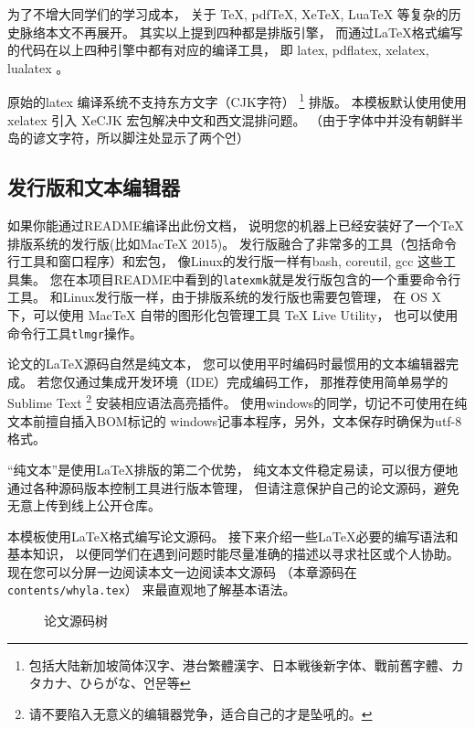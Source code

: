 为了不增大同学们的学习成本，
关于 TeX, pdfTeX,  XeTeX,  LuaTeX 等复杂的历史脉络本文不再展开。
其实以上提到四种都是排版引擎，
而通过\LaTeX 格式编写的代码在以上四种引擎中都有对应的编译工具，
即 latex, pdflatex, xelatex, lualatex 。

原始的latex 编译系统不支持东方文字（CJK字符）
\footnote{包括大陆新加坡简体汉字、港台繁體漢字、日本戦後新字体、戰前舊字體、カタカナ、ひらがな、언문等}
排版。
本模板默认使用使用 xelatex 引入 XeCJK 宏包解决中文和西文混排问题。
（由于字体中并没有朝鲜半岛的谚文字符，所以脚注处显示了两个언）

\subsection{发行版和文本编辑器}
如果你能通过README编译出此份文档，
说明您的机器上已经安装好了一个\TeX 排版系统的发行版(比如MacTeX 2015)。
发行版融合了非常多的工具（包括命令行工具和窗口程序）和宏包，
像Linux的发行版一样有bash, coreutil, gcc 这些工具集。
您在本项目README中看到的\texttt{latexmk}就是发行版包含的一个重要命令行工具。
和Linux发行版一样，由于排版系统的发行版也需要包管理，
在 OS X 下，可以使用 MacTeX 自带的图形化包管理工具 TeX Live Utility，
也可以使用命令行工具\texttt{tlmgr}操作。

论文的\LaTeX 源码自然是纯文本，
您可以使用平时编码时最惯用的文本编辑器完成。
若您仅通过集成开发环境（IDE）完成编码工作，
那推荐使用简单易学的Sublime Text
\footnote{请不要陷入无意义的编辑器党争，适合自己的才是坠吼的。}
安装相应语法高亮插件。
使用windows的同学，切记不可使用在纯文本前擅自插入BOM标记的
windows记事本程序，另外，文本保存时确保为utf-8格式。

“纯文本”是使用\LaTeX 排版的第二个优势，
纯文本文件稳定易读，可以很方便地通过各种源码版本控制工具进行版本管理，
但请注意保护自己的论文源码，避免无意上传到线上公开仓库。

本模板使用\LaTeX 格式编写论文源码。
\label{dirtree}
接下来介绍一些\LaTeX 必要的编写语法和基本知识，
以便同学们在遇到问题时能尽量准确的描述以寻求社区或个人协助。
现在您可以分屏一边阅读本文一边阅读本文源码
（本章源码在\texttt{contents/whyla.tex}）
来最直观地了解基本语法。

\begin{figure}[htbp]
    \centering
    \caption{论文源码树}
\end{figure}

